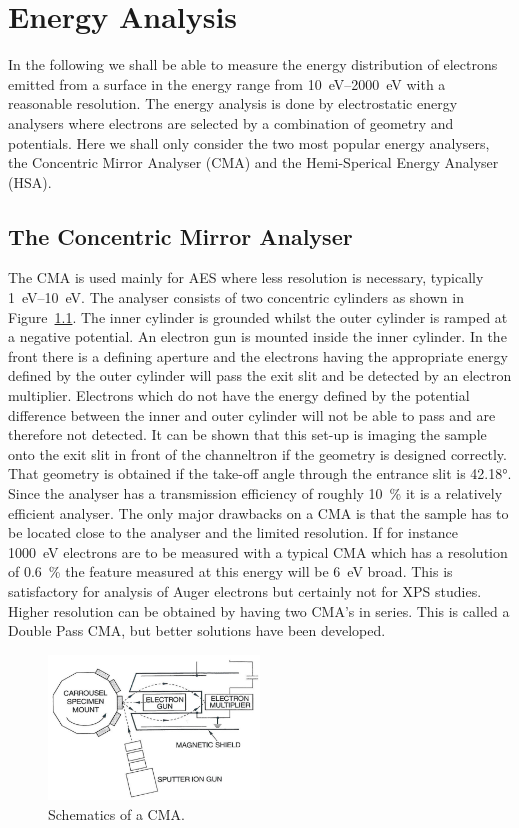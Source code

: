 \chapter{Energy Analysis}\label{ch:ea}
In the following we shall be able to measure the energy distribution of electrons emitted from a surface in the energy range from \SIrange{10}{2000}{\electronvolt} with a reasonable resolution. The energy analysis is done by electrostatic energy analysers where electrons are selected by a combination of geometry and potentials. Here we shall only consider the two most popular energy analysers, the Concentric Mirror Analyser (CMA) and the Hemi-Sperical Energy Analyser (HSA).

\section{The Concentric Mirror Analyser}
The CMA is used mainly for AES where less resolution is necessary, typically \SIrange{1}{10}{\electronvolt}. The analyser consists of two concentric cylinders as shown in Figure~\ref{fig:schematics_cma}. The inner cylinder is grounded whilst the outer cylinder is ramped at a negative potential. An electron gun is mounted inside the inner cylinder. In the front there is a defining aperture and the electrons having the appropriate energy defined by the outer cylinder will pass the exit slit and be detected by an electron multiplier. Electrons which do not have the energy defined by the potential difference between the inner and outer cylinder will not be able to pass and are therefore not detected. It can be shown that this set-up is imaging the sample onto the exit slit in front of the channeltron if the geometry is designed correctly. That geometry is obtained if the take-off angle through the entrance slit is \ang{42.18}. Since the analyser has a transmission efficiency of roughly \SI{10}{\percent} it is a relatively efficient analyser. The only major drawbacks on a CMA is that the sample has to be located close to the analyser and the limited resolution. If for instance \SI{1000}{\electronvolt} electrons are to be measured with a typical CMA which has a resolution of \SI{0.6}{\percent} the feature measured at this energy will be \SI{6}{\electronvolt} broad. This is satisfactory for analysis of Auger electrons but certainly not for XPS studies. Higher resolution can be obtained by having two CMA's in series. This is called a Double Pass CMA, but better solutions have been developed.

\begin{figure}[htbp]
\centering
\includegraphics[width=0.5\textwidth]{figures/03_01}
\caption{Schematics of a CMA.}
\label{fig:schematics_cma}
\end{figure}


